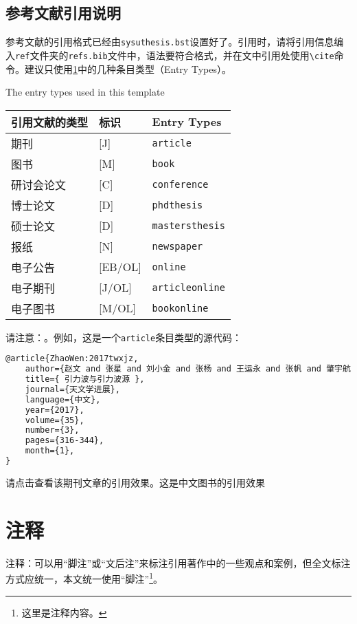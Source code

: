 \subsection{参考文献引用说明}

参考文献的引用格式已经由\texttt{sysuthesis.bst}设置好了。引用时，请将引用信息编入\texttt{ref}文件夹的\texttt{refs.bib}文件中，语法要符合格式，并在文中引用处使用\texttt{\textbackslash cite}命令。建议只使用\ref{tab:entrytypes}中的几种条目类型（Entry Types）。
\begin{table}[htbp]
    {The entry types used in this template}
    \label{tab:entrytypes}
    \centering
    \begin{tabular}{lll}
    \toprule
    引用文献的类型  & 标识 & Entry Types \\
    \midrule
    期刊    &[J] & \texttt{article} \\
    图书    &[M] & \texttt{book} \\
    研讨会论文 &[C]    & \texttt{conference} \\  
    博士论文   &[D]  & \texttt{phdthesis} \\
    硕士论文   &[D]  & \texttt{mastersthesis} \\
    报纸      &[N] & \texttt{newspaper} \\
    电子公告   &[EB/OL] & \texttt{online} \\
    电子期刊   &[J/OL] & \texttt{articleonline} \\
    电子图书   &[M/OL] & \texttt{bookonline} \\
    \bottomrule
    \end{tabular}
\end{table}
请注意：。例如，这是一个\texttt{article}条目类型的源代码：
\begin{lstlisting}[language=TeX,
    caption1={\hologo{BibTeX}代码示例},
    caption2={\hologo{BibTeX} code example}]
% ./ref/refs.bib
@article{ZhaoWen:2017twxjz,
    author={赵文 and 张星 and 刘小金 and 张杨 and 王运永 and 张帆 and 肇宇航 and 郭越凡 and 陈奕康 and 艾舜柯 and 朱宗宏 and WANG Xiao-ge and LEBIGOT Eric and 都志辉 and 曹军威 and 钱进 and 殷聪 and 王建波 and BLAIR David and JU Li and ZHAO Chun-nong and WEN Lin-qing},
    title={ 引力波与引力波源 },
    journal={天文学进展},
    language={中文},
    year={2017},
    volume={35},
    number={3},
    pages={316-344},
    month={1},
}
\end{lstlisting}
请点击\cite{ZhaoWen:2017twxjz}查看该期刊文章的引用效果。这是中文图书的引用效果\cite{Huang:2012hxwl}

\section{注释}

注释：可以用“脚注”或“文后注”来标注引用著作中的一些观点和案例，但全文标注方式应统一，本文统一使用“脚注”\footnote{这里是注释内容。}。
